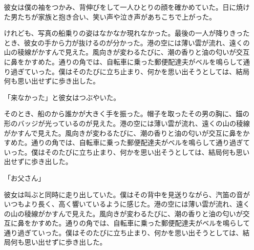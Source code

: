 \documentclass[tate,paper=a5,fontsize=10pt]{jlreq}
\begin{document}
彼女は僕の袖をつかみ、背伸びをして一人ひとりの顔を確かめていた。日に焼けた男たちが家族と抱き合い、笑い声や泣き声があちこちで上がった。

けれども、写真の船乗りの姿はなかなか現れなかった。最後の一人が降りきったとき、彼女の手から力が抜けるのが分かった。港の空には薄い雲が流れ、遠くの山の稜線がかすんで見えた。風向きが変わるたびに、潮の香りと油の匂いが交互に鼻をかすめた。通りの角では、自転車に乗った郵便配達夫がベルを鳴らして通り過ぎていった。僕はそのたびに立ち止まり、何かを思い出そうとしては、結局何も思い出せずに歩き出した。

「来なかった」と彼女はつぶやいた。

そのとき、船のから誰かが大きく手を振った。帽子を取ったその男の胸に、錨の形のバッジが光っているのが見えた。港の空には薄い雲が流れ、遠くの山の稜線がかすんで見えた。風向きが変わるたびに、潮の香りと油の匂いが交互に鼻をかすめた。通りの角では、自転車に乗った郵便配達夫がベルを鳴らして通り過ぎていった。僕はそのたびに立ち止まり、何かを思い出そうとしては、結局何も思い出せずに歩き出した。

「お父さん」

彼女は叫ぶと同時に走り出していた。僕はその背中を見送りながら、汽笛の音がいつもより長く、高く響いているように感じた。港の空には薄い雲が流れ、遠くの山の稜線がかすんで見えた。風向きが変わるたびに、潮の香りと油の匂いが交互に鼻をかすめた。通りの角では、自転車に乗った郵便配達夫がベルを鳴らして通り過ぎていった。僕はそのたびに立ち止まり、何かを思い出そうとしては、結局何も思い出せずに歩き出した。
\end{document}

